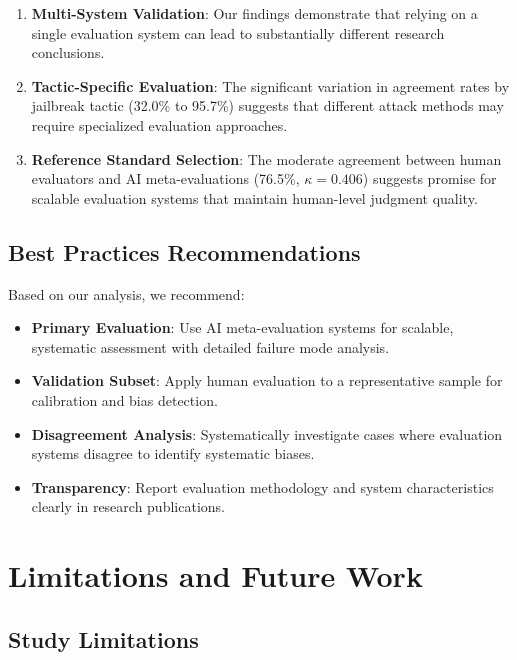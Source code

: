 \documentclass[11pt]{article}
\begin{document}
\begin{enumerate}
    \item \textbf{Multi-System Validation}: Our findings demonstrate that relying on a single evaluation system can lead to substantially different research conclusions.
    
    \item \textbf{Tactic-Specific Evaluation}: The significant variation in agreement rates by jailbreak tactic (32.0\% to 95.7\%) suggests that different attack methods may require specialized evaluation approaches.
    
    \item \textbf{Reference Standard Selection}: The moderate agreement between human evaluators and AI meta-evaluations (76.5\%, $\kappa = 0.406$) suggests promise for scalable evaluation systems that maintain human-level judgment quality.
\end{enumerate}

\subsection{Best Practices Recommendations}

Based on our analysis, we recommend:

\begin{itemize}
    \item \textbf{Primary Evaluation}: Use AI meta-evaluation systems for scalable, systematic assessment with detailed failure mode analysis.
    \item \textbf{Validation Subset}: Apply human evaluation to a representative sample for calibration and bias detection.
    \item \textbf{Disagreement Analysis}: Systematically investigate cases where evaluation systems disagree to identify systematic biases.
    \item \textbf{Transparency}: Report evaluation methodology and system characteristics clearly in research publications.
\end{itemize}

\section{Limitations and Future Work}

\subsection{Study Limitations}
\end{document}
